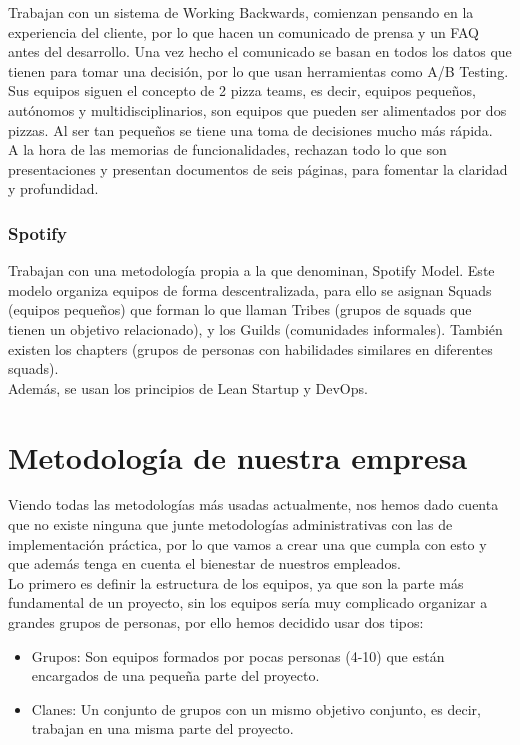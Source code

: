 Trabajan con un sistema de Working Backwards, comienzan pensando en la experiencia del cliente, por lo que hacen un comunicado de prensa y un FAQ antes del desarrollo. Una vez hecho el comunicado se basan en todos los datos que tienen para tomar una decisión, por lo que usan herramientas como A/B Testing.\\

Sus equipos siguen el concepto de 2 pizza teams, es decir, equipos pequeños, autónomos y multidisciplinarios, son equipos que pueden ser alimentados por dos pizzas. Al ser tan pequeños se tiene una toma de decisiones mucho más rápida.\\

A la hora de las memorias de funcionalidades, rechazan todo lo que son presentaciones y presentan documentos de seis páginas, para fomentar la claridad y profundidad.

\subsubsection{Spotify}

Trabajan con una metodología propia a la que denominan, Spotify Model. Este modelo organiza equipos de forma descentralizada, para ello se asignan Squads (equipos pequeños) que forman lo que llaman Tribes (grupos de squads que tienen un objetivo relacionado), y los Guilds (comunidades informales). También existen los chapters (grupos de personas con habilidades similares en diferentes squads).\\

Además, se usan los principios de Lean Startup y DevOps.

\section{Metodología de nuestra empresa}

Viendo todas las metodologías más usadas actualmente, nos hemos dado cuenta que no existe ninguna que junte metodologías administrativas con las de implementación práctica, por lo que vamos a crear una que cumpla con esto y que además tenga en cuenta el bienestar de nuestros empleados.\\

Lo primero es definir la estructura de los equipos, ya que son la parte más fundamental de un proyecto, sin los equipos sería muy complicado organizar a grandes grupos de personas, por ello hemos decidido usar dos tipos:
\begin{itemize}
    \item Grupos: Son equipos formados por pocas personas (4-10) que están encargados de una pequeña parte del proyecto.
    \item Clanes: Un conjunto de grupos con un mismo objetivo conjunto, es decir, trabajan en una misma parte del proyecto.
\end{itemize}

